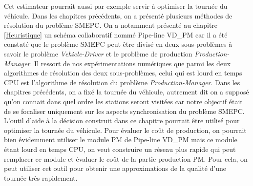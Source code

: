  Cet estimateur pourrait aussi par exemple servir à optimiser la tournée du véhicule. Dans les chapitres précédents, on a présenté plusieurs méthodes de résolution du problème SMEPC. On a notamment présenté au chapitre \ref{Heuristique} un schéma collaboratif nommé Pipe-line VD\_PM car il a été constaté que le problème SMEPC peut être divisé en deux sous-problèmes à savoir le problème \textit{Vehicle-Driver} et le problème de production \textit{Production-Manager}. Il ressort de nos expérimentations numériques que parmi les deux algorithmes de résolution des deux sous-problèmes, celui qui est lourd en temps CPU est l'algorithme de résolution du problème \textit{Production-Manager}.
Dans les chapitres précédents, on a fixé la tournée du véhicule, autrement dit on a supposé qu'on connait dans quel ordre les stations seront visitées car notre objectif était de se focaliser uniquement sur les aspects synchronisation du problème SMEPC. L'outil d'aide à la décision construit dans ce chapitre pourrait être utilisé pour optimiser la tournée du véhicule. Pour évaluer le coût de production, on pourrait bien évidemment utiliser le module PM de Pipe-line VD\_PM mais ce module étant lourd en temps CPU, on veut construire un réseau plus rapide qui peut remplacer ce module et évaluer le coût de la partie production PM.  Pour cela, on peut utiliser cet outil pour obtenir une approximations de la qualité d'une tournée très rapidement.

